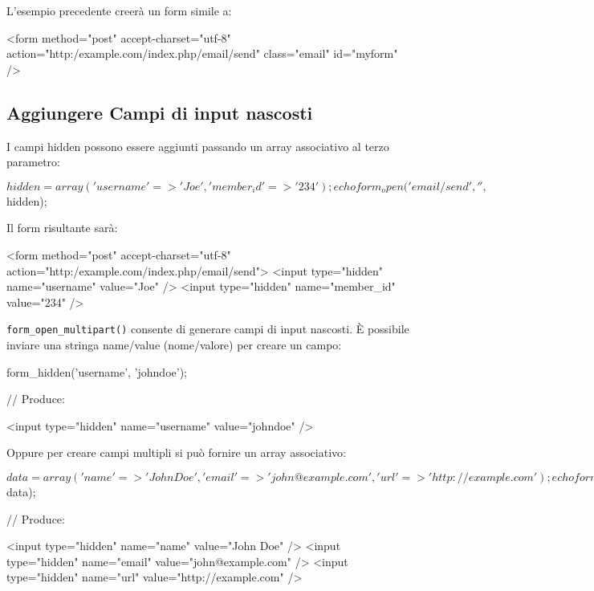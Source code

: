 L'esempio precedente creerà un form simile a:

\begin{code}
<form method="post" accept-charset="utf-8" action="http:/example.com/index.php/email/send"  class="email"  id="myform" />
\end{code}

\subsection*{Aggiungere Campi di input nascosti}

I campi hidden possono essere aggiunti passando un array associativo al terzo parametro:

\begin{code}
$hidden = array('username' => 'Joe', 'member_id' => '234');

echo form_open('email/send', '', $hidden);
\end{code}

Il form risultante sarà:

\begin{code}
<form method="post" accept-charset="utf-8" action="http:/example.com/index.php/email/send">
<input type="hidden" name="username" value="Joe" />
<input type="hidden" name="member_id" value="234" />
\end{code}

\verb|form_open_multipart()| consente di generare campi di input nascosti. È possibile inviare una stringa name/value (nome/valore) per creare un campo:

\begin{code}
form_hidden('username', 'johndoe');

// Produce:

<input type="hidden" name="username" value="johndoe" />
\end{code}

Oppure per creare campi multipli si può fornire un array associativo:

\begin{code}
$data = array(
              'name'  => 'John Doe',
              'email' => 'john@example.com',
              'url'   => 'http://example.com'
            );

echo form_hidden($data);

// Produce:

<input type="hidden" name="name" value="John Doe" />
<input type="hidden" name="email" value="john@example.com" />
<input type="hidden" name="url" value="http://example.com" />
\end{code}

